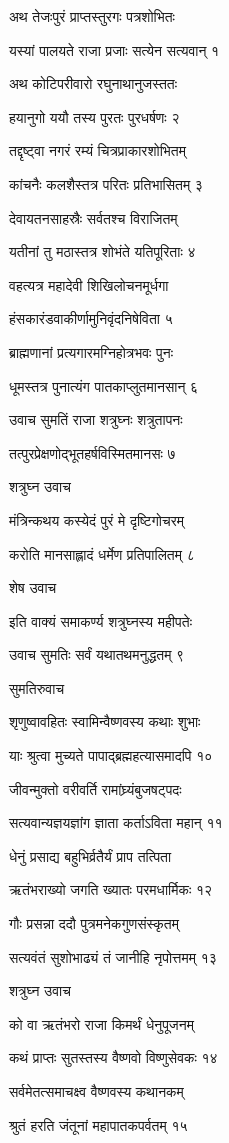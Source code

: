 अथ तेजःपुरं प्राप्तस्तुरगः पत्रशोभितः

यस्यां पालयते राजा प्रजाः सत्येन सत्यवान् १

अथ कोटिपरीवारो रघुनाथानुजस्ततः

हयानुगो ययौ तस्य पुरतः पुरधर्षणः २

तद्दृष्ट्वा नगरं रम्यं चित्रप्राकारशोभितम्

कांचनैः कलशैस्तत्र परितः प्रतिभासितम् ३

देवायतनसाहस्रैः सर्वतश्च विराजितम्

यतीनां तु मठास्तत्र शोभंते यतिपूरिताः ४

वहत्यत्र महादेवी शिखिलोचनमूर्धगा

हंसकारंडवाकीर्णामुनिवृंदनिषेविता ५

ब्राह्मणानां प्रत्यगारमग्निहोत्रभवः पुनः

धूमस्तत्र पुनात्यंग पातकाप्लुतमानसान् ६

उवाच सुमतिं राजा शत्रुघ्नः शत्रुतापनः

तत्पुरप्रेक्षणोद्भूतहर्षविस्मितमानसः ७

शत्रुघ्न उवाच

मंत्रिन्कथय कस्येदं पुरं मे दृष्टिगोचरम्

करोति मानसाह्लादं धर्मेण प्रतिपालितम् ८

शेष उवाच

इति वाक्यं समाकर्ण्य शत्रुघ्नस्य महीपतेः

उवाच सुमतिः सर्वं यथातथमनुद्धतम् ९

सुमतिरुवाच

शृणुष्वावहितः स्वामिन्वैष्णवस्य कथाः शुभाः

याः श्रुत्वा मुच्यते पापाद्ब्रह्महत्यासमादपि १०

जीवन्मुक्तो वरीवर्ति रामांघ्र्यंबुजषट्पदः

सत्यवान्यज्ञयज्ञांग ज्ञाता कर्ताऽविता महान् ११

धेनुं प्रसाद्य बहुभिर्व्रतैर्यं प्राप तत्पिता

ऋतंभराख्यो जगति ख्यातः परमधार्मिकः १२

गौः प्रसन्ना ददौ पुत्रमनेकगुणसंस्कृतम्

सत्यवंतं सुशोभाढ्यं तं जानीहि नृपोत्तमम् १३

शत्रुघ्न उवाच

को वा ऋतंभरो राजा किमर्थं धेनुपूजनम्

कथं प्राप्तः सुतस्तस्य वैष्णवो विष्णुसेवकः १४

सर्वमेतत्समाचक्ष्व वैष्णवस्य कथानकम्

श्रुतं हरति जंतूनां महापातकपर्वतम् १५

